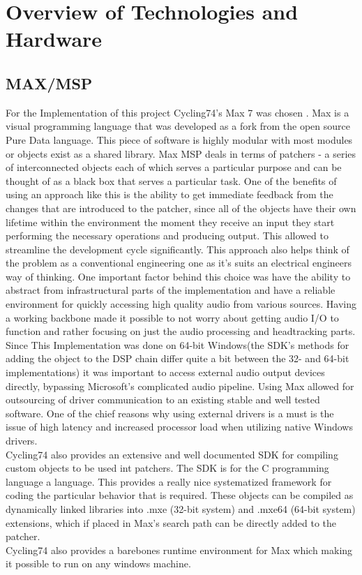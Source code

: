 \documentclass[a4paper,12pt,oneside]{article}
\begin{document}
\section{Overview of Technologies and Hardware}

\subsection{MAX/MSP}

For the Implementation of this project Cycling74's Max 7 was chosen \cite{max}. Max is a visual programming language that was developed as a fork from the open source Pure Data language. This piece of software is highly modular with most modules or objects exist as a shared library. Max MSP deals in terms of patchers - a series of interconnected objects each of which serves a particular purpose and can be thought of as a black box that serves a particular task. One of the benefits of using an approach like this is the ability to get immediate feedback from the changes that are introduced to the patcher, since all of the objects have their own lifetime within the environment the moment they receive an input they start performing the necessary operations and producing output. This allowed to streamline the development cycle significantly. This approach also helps think of the problem as a conventional engineering one as it's suits an electrical engineers way of thinking. One important factor behind this choice was have the ability to abstract from infrastructural parts of the implementation and have a reliable environment for quickly accessing high quality audio from various sources. Having a working backbone made it possible to not worry about getting audio I/O to function and rather focusing on just the audio processing and headtracking parts. Since This Implementation was done on 64-bit Windows(the SDK's methods for adding the object to the DSP chain differ quite a bit between the 32- and 64-bit implementations) it was important to access external audio output devices directly, bypassing Microsoft's complicated audio pipeline. Using Max allowed for outsourcing of driver communication to an existing stable and well tested software. One of the chief reasons why using external drivers is a must is the issue of high latency and increased processor load when utilizing native Windows drivers.\\
Cycling74 also provides an extensive and well documented SDK\cite{maxsdk} for compiling custom objects to be used int patchers. The SDK is for the C programming language a language. This provides a really nice systematized framework for coding the particular behavior that is required. These objects can be compiled as dynamically linked libraries into .mxe (32-bit system) and .mxe64 (64-bit system) extensions, which if placed in Max's search path can be directly added to the patcher.\\
Cycling74 also provides a barebones runtime environment for Max which making it possible to run on any windows machine.
\end{document}
